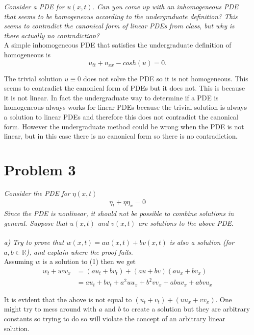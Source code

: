 \documentclass[12pt]{article}
\theoremstyle{remark}
\begin{document}
\textit{Consider a PDE for $u(x,t)$. Can you come up with an inhomogeneous PDE that seems to be homogeneous according to the undergraduate definition? This seems to contradict the canonical form of linear PDEs from class, but why is there actually no contradiction?} \\

A simple inhomogeneous PDE that satisfies the undergraduate definition of homogeneous is 
$$ u_{tt} + u_{xx} - cosh(u) = 0. $$

The trivial solution $u \equiv 0$ does not solve the PDE so it is not homogeneous. This seems to contradict the canonical form of PDEs but it does not. This is because it is not linear. In fact the undergraduate way to determine if a PDE is homogeneous always works for linear PDEs because the trivial solution is always a solution to linear PDEs and therefore this does not contradict the canonical form. However the undergraduate method could be wrong when the PDE is not linear, but in this case there is no canonical form so there is no contradiction.

\pagebreak

\section*{Problem 3}

\textit{Consider the PDE for $\eta(x,t)$}
\begin{align}
	\eta_t + \eta\eta_x = 0
\end{align}
\textit{Since the PDE is nonlinear, it should not be possible to combine solutions in general. Suppose that $u(x,t)$ and $v(x,t)$ are solutions to the above PDE.} \\ \\
\textit{a) Try to prove that $w(x,t) = au(x,t) + bv(x,t)$ is also a solution (for $a,b \in \mathbb{R}$), and explain where the proof fails.} \\

Assuming $w$ is a solution to (1) then we get
\begin{align*}
	w_t + ww_x & = (au_t + bv_t) + (au + bv)(au_x + bv_x) \\
	& = au_t + bv_t + a^2uu_x + b^2vv_x + abuv_x + abvu_x
\end{align*}

It is evident that the above is not equal to $(u_t + v_t) + (uu_x + vv_x)$. One might try to mess around with $a$ and $b$ to create a solution but they are arbitrary constants so trying to do so will violate the concept of an arbitrary linear solution. \\
\end{document}
